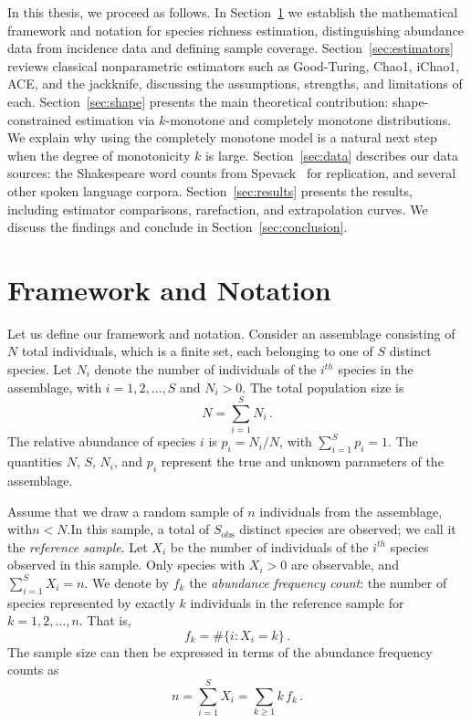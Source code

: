 ﻿\documentclass{article}
\begin{document}
\vspace{1em}

In this thesis, we proceed as follows. In Section~\ref{sec:framework} we establish the mathematical framework and notation for species richness estimation, distinguishing abundance data from incidence data and defining sample coverage. Section~\ref{sec:estimators} reviews classical nonparametric estimators such as Good-Turing, Chao1, iChao1, ACE, and the jackknife, discussing the assumptions, strengths, and limitations of each. Section~\ref{sec:shape} presents the main theoretical contribution: shape-constrained estimation via $k$-monotone and completely monotone distributions. We explain why using the completely monotone model is a natural next step when the degree of monotonicity $k$ is large.
Section~\ref{sec:data} describes our data sources: the Shakespeare word counts from Spevack~\cite{Spevack1968} for replication, and several other spoken language corpora. Section~\ref{sec:results} presents the results, including estimator comparisons, rarefaction, and extrapolation curves. We discuss the findings and conclude in Section~\ref{sec:conclusion}.

\clearpage
\section{Framework and Notation}\label{sec:framework}

Let us define our framework and notation. Consider an assemblage consisting of $N$ total individuals, which is a finite set, each belonging to one of $S$ distinct species. Let $N_i$ denote the number of individuals of the $i^{th}$ species in the assemblage, with $i = 1, 2, \ldots, S$ and $N_i > 0$. The total population size is
\[
    N = \sum_{i=1}^{S} N_i\,.
\]
The relative abundance of species $i$ is $p_i = N_i / N$, with  $\sum_{i=1}^{S} p_i = 1$. The quantities $N$, $S$, $N_i$, and $p_i$ represent the true and unknown parameters of the assemblage.

Assume that we draw a random sample of $n$ individuals from the assemblage, with\quad $n<N$.\quad In this sample, a total of $S_{\mathrm{obs}}$ distinct species are observed; we call it the \emph{reference sample}. Let $X_i$ be the number of individuals of the $i^{th}$ species observed in this sample. Only species with $X_i > 0$ are observable, and $\sum_{i=1}^{S} X_i = n$. We denote by $f_k$ the \emph{abundance frequency count}: the number of species represented by exactly $k$ individuals in the reference sample for $k = 1, 2, \ldots, n$. That is,
\[
    f_k = \#\{i : X_i = k\}\,.
\]
The sample size can then be expressed in terms of the abundance frequency counts as
\[
    n = \sum_{i=1}^{S} X_i = \sum_{k \geq 1} k\, f_k\,.
\]
\end{document}
